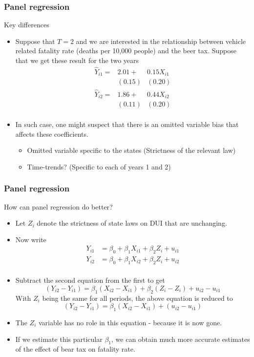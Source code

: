 \documentclass[compress]{beamer}
\begin{document}
\begin{frame}
\frametitle{Panel regression}
Key differences
\begin{itemize}
\item Suppose that $T=2$ and we are interested in the relationship between vehicle related fatality rate (deaths per 10,000 people) and the beer tax. Suppose that we get these result for the two years
\[
\begin{aligned}
\hat{Y}_{i1} =&2.01 +&0.15X_{i1}\\
                    &(0.15)&(0.20) \\
\hat{Y}_{i2} =&1.86 +&0.44X_{i2}\\
                    &(0.11)&(0.20) \\                    
\end{aligned}
\]
\item  In such case, one might suspect that there is an omitted variable bias that affects these coefficients.
\begin{itemize}
\item Omitted variable specific to the states (Strictness of the relevant law)
\item Time-trends? (Specific to each of years 1 and 2)
\end{itemize}
\end{itemize}
\end{frame}

\begin{frame}
\frametitle{Panel regression}
How can panel regression do better?
\begin{itemize}
\item Let $Z_i$ denote the strictness of state laws on DUI that are unchanging. 
\item Now write
\[
\begin{aligned}
Y_{i1}& = \beta_0 + \beta_1X_{i1}+\beta_2 Z_{i}+u_{i1} \\                
Y_{i2}& = \beta_0 + \beta_1X_{i2}+\beta_2 Z_{i}+u_{i2} \\                
\end{aligned}
\]
\item Subtract the second equation from the first to get
\[
(Y_{i2}-Y_{i1}) = \beta_1(X_{i2}-X_{i1}) +\beta_2(Z_{i}-Z_{i}) + u_{i2}-u_{i1}
\]
With $Z_i$ being the same for all periods, the above equation is reduced to
\[
(Y_{i2}-Y_{i1}) = \beta_1(X_{i2}-X_{i1}) +(u_{i2}-u_{i1})
\]
\item The $Z_i$ variable has no role in this equation - because it is now gone.
\item If we estimate this particular $\beta_1$, we can obtain much more accurate estimates of the effect of bear tax on fatality rate. 
\end{itemize}
\end{frame}
\end{document}

